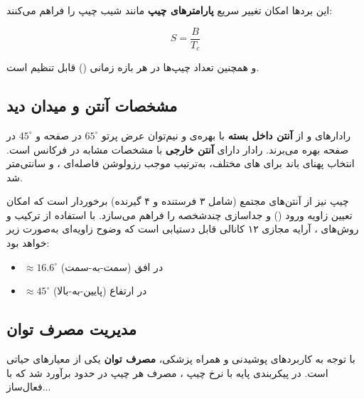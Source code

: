 این بردها امکان تغییر سریع \textbf{پارامترهای چیپ} مانند شیب چیپ را فراهم می‌کنند:

\begin{equation}
S = \frac{B}{T_c}
\label{eq:chirp_slope}
\end{equation}

و همچنین تعداد چیپ‌ها در هر بازه زمانی () قابل تنظیم است.

\subsection{مشخصات آنتن و میدان دید}
\label{sec:antenna-fov}

رادارهای  و  از \textbf{آنتن داخل بسته} با بهره‌ی  و نیم‌توان عرض پرتو $65^\circ$ در صفحه  و $45^\circ$ در صفحه  بهره می‌برند. رادار  دارای \textbf{آنتن خارجی} با مشخصات مشابه در فرکانس  است. انتخاب پهنای باند  برای های مختلف، به‌ترتیب موجب رزولوشن فاصله‌ای ،  و  سانتی‌متر شد.

چیپ  نیز از آنتن‌‌های مجتمع  (شامل ۳ فرستنده و ۴ گیرنده) برخوردار است که امکان تعیین زاویه ورود () و جداسازی چندشخصه را فراهم می‌سازد. با استفاده از ترکیب  و روش‌های ، آرایه مجازی ۱۲ کانالی قابل دستیابی است که وضوح زاویه‌ای به‌صورت زیر خواهد بود:

\begin{itemize}
  \item $\approx 16.6^\circ$ در افق (سمت-به-سمت)
  \item $\approx 45^\circ$ در ارتفاع (پایین-به-بالا)
\end{itemize}

\subsection{مدیریت مصرف توان}
\label{sec:power-management}

با توجه به کاربردهای پوشیدنی و همراه پزشکی، \textbf{مصرف توان} یکی از معیارهای حیاتی است. در پیکربندی پایه با نرخ چیپ ، مصرف هر چیپ در حدود  برآورد شد که با فعال‌ساز...
